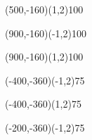 \documentclass[12pt]{article}
\begin{document}
\begin{figure}[htb]
\begin{egame}
\putbranch(500,-160)(1,2){100}

\renewcommand{\egarrowstyle}{e}

\putbranch(900,-160)(-1,2){100}

\renewcommand{\egarrowstyle}{}

\putbranch(900,-160)(1,2){100}




\renewcommand{\egarrowstyle}{e}

\putbranch(-400,-360)(-1,2){75}

\renewcommand{\egarrowstyle}{}

\putbranch(-400,-360)(1,2){75}



\renewcommand{\egarrowstyle}{}

\putbranch(-200,-360)(-1,2){75}


\end{egame}
\end{figure}
\end{document}
